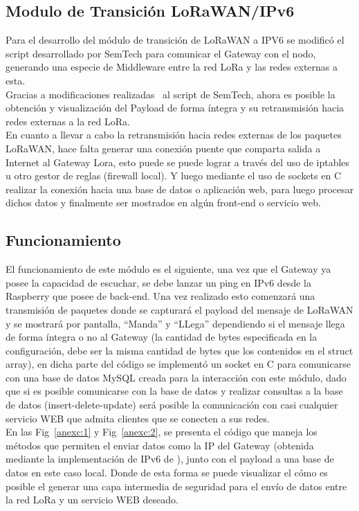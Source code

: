 \begin{justify}
\section{Modulo de Transición LoRaWAN/IPv6}
Para el desarrollo del módulo de transición de LoRaWAN a IPV6 se modificó el script desarrollado por SemTech para comunicar el Gateway con el nodo, generando una especie de Middleware entre la red LoRa y las redes externas a esta.\\
 Gracias a modificaciones realizadas~\cite{tomas} al script de SemTech, ahora es posible la obtención y visualización del Payload de forma íntegra y su retransmisión hacia redes externas a la red LoRa.\\
En cuanto a llevar a cabo la retransmisión hacia redes externas de los paquetes LoRaWAN, hace falta generar una conexión puente que comparta salida a Internet al Gateway Lora, esto puede se puede lograr a través del uso de  iptables u otro gestor de reglas (firewall local). Y luego mediante el uso de sockets en C realizar la conexión hacia una base de datos o aplicación web, para luego procesar dichos datos y finalmente ser mostrados en algún front-end o servicio web.
\subsection{Funcionamiento}
El funcionamiento de este módulo es el siguiente, una vez que el Gateway ya posee la capacidad de escuchar, se debe lanzar un ping en IPv6 desde la Raspberry que posee de back-end. Una vez realizado esto comenzará una transmisión de paquetes donde se capturará el payload del mensaje de LoRaWAN y se mostrará por pantalla,  ``Manda'' y ``LLega'' dependiendo si el mensaje llega de forma íntegra o no al Gateway (la cantidad de bytes especificada en la configuración, debe ser la misma cantidad de bytes que los contenidos en el struct array), en dicha parte del código se implementó un socket en C para comunicarse con una base de datos MySQL creada para la interacción con este módulo, dado que si es posible comunicarse con la base de datos y realizar consultas a la base de datos (insert-delete-update) será posible la comunicación con casi cualquier servicio WEB que admita clientes que se conecten a sus redes.\\
En las Fig~\ref{anexc:1} y Fig~\ref{anexc:2}, se presenta el código que maneja los métodos que permiten el enviar datos como la IP del Gateway (obtenida mediante la implementación de IPv6 de \cite{tomas}), junto con el payload a una base de datos en este caso local. Donde de esta forma se puede visualizar el cómo es posible el generar una capa intermedia de seguridad para el envío de datos entre la red LoRa y un servicio WEB deseado.

\end{justify}
